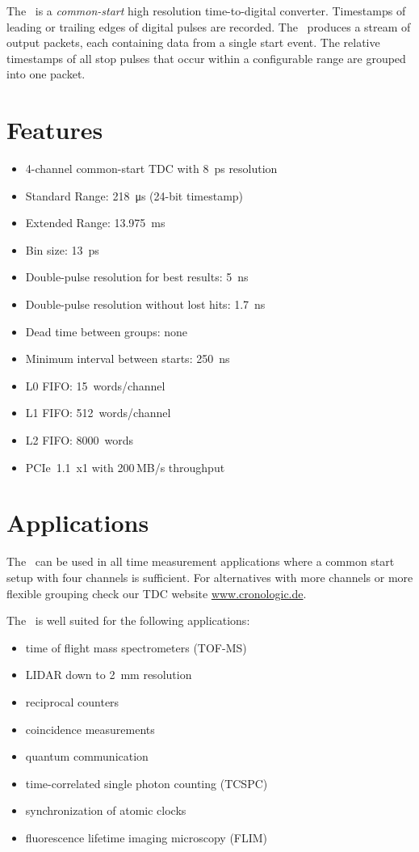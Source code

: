 The \deviceName\ is a \emph{common-start} high resolution time-to-digital
converter.  Timestamps of leading or trailing edges of digital pulses are
recorded.  The \deviceName\ produces a stream of output packets, each
containing data from a single start event.  The relative timestamps of all
stop pulses that occur within a configurable range are grouped into one packet.

\section{Features}
	\begin{itemize}
		\item 4-channel common-start TDC with 8~ps resolution
		\item Standard Range: \SI{218}{\micro\second} (24-bit timestamp)
		\item Extended Range: \SI{13.975}{\milli\second}
		\item Bin size: \SI{13}{\pico\second}
		\item Double-pulse resolution for best results: \SI{5}{\nano\second}
		\item Double-pulse resolution without lost hits: \SI{1.7}{\nano\second}
		\item Dead time between groups: none
		\item Minimum interval between starts: \SI{250}{\nano\second}
		\item L0 FIFO: 15~words/channel
		\item L1 FIFO: 512~words/channel
		\item L2 FIFO: 8000~words
		\item PCIe~1.1~x1 with 200\,MB/s throughput
	\end{itemize} 

\clearpage
\section{Applications}
The \deviceName\ can be used in all time measurement applications where a
common start setup with four channels is sufficient.  For alternatives with
more channels or more flexible grouping check our TDC website
\href{https://www.cronologic.de/produkte/products-overview#tdcdata}{www.cronologic.de}.

The \deviceName\ is well suited for the following applications:
\begin{itemize}
	\item time of flight mass spectrometers (TOF-MS)
	\item LIDAR down to \SI{2}{\milli\meter} resolution
	\item reciprocal counters
	\item coincidence measurements
	\item quantum communication
	\item time-correlated single photon counting (TCSPC)
	\item synchronization of atomic clocks
	\item fluorescence lifetime imaging microscopy (FLIM)
\end{itemize} 